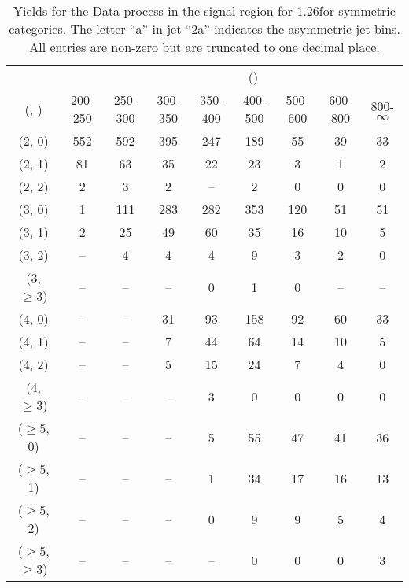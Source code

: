 \begin{table}[h!]
\tiny
\centering
\caption{Yields for the Data process in the signal region for 1.26\ifb for symmetric categories. The letter ``a'' in jet \eg ``2a''  indicates the asymmetric jet bins. All entries are non-zero but are truncated to one decimal place.\label{tab:yieldssep_data_sig_sym}}
\begin{tabular}
{ccccccccc}
	\hline\hline
&	& \multicolumn{8}{c}{\scalht (\gev)} \\ 
	 (\njet,  \nb) & 200-250 & 250-300 & 300-350 & 350-400 & 400-500 & 500-600 & 600-800 & 800-$\infty$ \\ [0.8ex] 
\hline
	(2, 0) & 552 & 592 & 395 & 247 & 189 & 55 & 39 & 33 \\[0.5ex] 
	(2, 1) & 81 & 63 & 35 & 22 & 23 & 3 & 1 & 2 \\[0.5ex] 
	(2, 2) & 2 & 3 & 2 & -- & 2 & 0 & 0 & 0 \\[0.5ex] 
	(3, 0) & 1 & 111 & 283 & 282 & 353 & 120 & 51 & 51 \\[0.5ex] 
	(3, 1) & 2 & 25 & 49 & 60 & 35 & 16 & 10 & 5 \\[0.5ex] 
	(3, 2) & -- & 4 & 4 & 4 & 9 & 3 & 2 & 0 \\[0.5ex] 
	(3, $\ge3$) & -- & -- & -- & 0 & 1 & 0 & -- & -- \\[0.5ex] 
	(4, 0) & -- & -- & 31 & 93 & 158 & 92 & 60 & 33 \\[0.5ex] 
	(4, 1) & -- & -- & 7 & 44 & 64 & 14 & 10 & 5 \\[0.5ex] 
	(4, 2) & -- & -- & 5 & 15 & 24 & 7 & 4 & 0 \\[0.5ex] 
	(4, $\ge3$) & -- & -- & -- & 3 & 0 & 0 & 0 & 0 \\[0.5ex] 
	($\ge5$, 0) & -- & -- & -- & 5 & 55 & 47 & 41 & 36 \\[0.5ex] 
	($\ge5$, 1) & -- & -- & -- & 1 & 34 & 17 & 16 & 13 \\[0.5ex] 
	($\ge5$, 2) & -- & -- & -- & 0 & 9 & 9 & 5 & 4 \\[0.5ex] 
	($\ge5$, $\ge3$) & -- & -- & -- & -- & 0 & 0 & 0 & 3 \\[0.5ex] 
	\hline
	\hline
\end{tabular}
\end{table}
